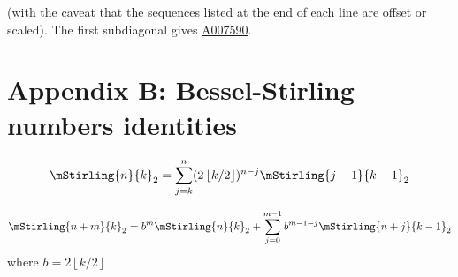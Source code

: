 \documentclass{article}
\newcommand{\floor}[1]{\left\lfloor #1 \right\rfloor}
\begin{document}
(with the caveat that the sequences listed at the end of each line are offset or scaled). The first subdiagonal gives \href{https://oeis.org/A007590}{A007590}.

\pagebreak
\section*{Appendix B: Bessel-Stirling numbers identities}

\begin{proposition}
    \[
        \mStirling{n}{k}_2 = \sum_{j=k}^{n}(2\floor{k/2})^{n-j} \mStirling{j-1}{k-1}_2
    \]
\end{proposition}


\[
    \mStirling{n+m}{k}_2 = b^m \mStirling{n}{k}_2 +\sum_{j=0}^{m-1}b^{m-1-j} \mStirling{n+j}{k-1}_2
\]
where $b=2\floor{k/2}$

\printbibliography
\end{document}
